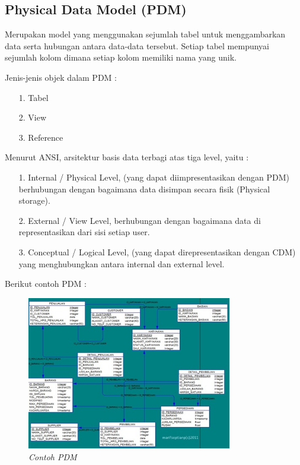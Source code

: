 \documentclass{jtetiproposalskripsi}
\begin{document}
\subsection{Physical Data Model (PDM)}
Merupakan model yang menggunakan sejumlah tabel untuk menggambarkan data serta hubungan antara data-data tersebut. Setiap tabel mempunyai sejumlah kolom dimana setiap kolom memiliki nama yang unik.

Jenis-jenis objek dalam PDM :
\begin{itemize}

\item[1.] Tabel
\item[2.] View
\item[3.] Reference
\end{itemize}
Menurut ANSI, arsitektur basis data terbagi atas tiga level, yaitu :
\begin{itemize}

\item[1.] Internal / Physical Level, (yang dapat diimpresentasikan dengan PDM) berhubungan dengan bagaimana  data disimpan secara fisik (Physical storage).
\item[2.] External / View Level, berhubungan dengan bagaimana data di representasikan dari sisi setiap user.
\item[3.] Conceptual / Logical Level, (yang dapat direpresentasikan dengan CDM) yang menghubungkan antara internal dan external level.
\end{itemize}

Berikut contoh PDM :
\begin{figure}[ht!]
\centering
\includegraphics[width=0.8\textwidth]{gambar/PDM}
\caption{\textit{Contoh PDM}}
\label{wsn}
\end{figure}
\newpage
\end{document}
